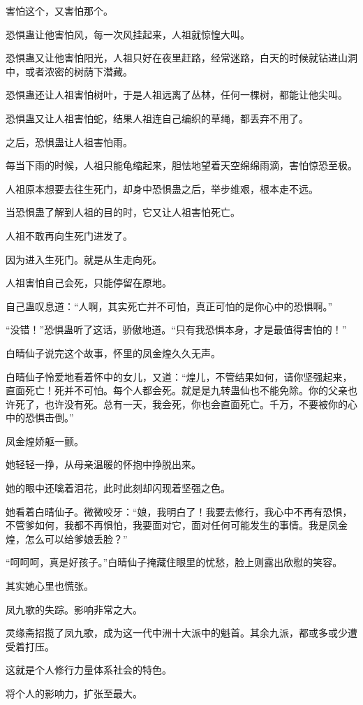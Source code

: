 \begin{this_body}
害怕这个，又害怕那个。

恐惧蛊让他害怕风，每一次风挂起来，人祖就惊惶大叫。

恐惧蛊又让他害怕阳光，人祖只好在夜里赶路，经常迷路，白天的时候就钻进山洞中，或者浓密的树荫下潜藏。

恐惧蛊还让人祖害怕树叶，于是人祖远离了丛林，任何一棵树，都能让他尖叫。

恐惧蛊又让人祖害怕蛇，结果人祖连自己编织的草绳，都丢弃不用了。

之后，恐惧蛊让人祖害怕雨。

每当下雨的时候，人祖只能龟缩起来，胆怯地望着天空绵绵雨滴，害怕惊恐至极。

人祖原本想要去往生死门，却身中恐惧蛊之后，举步维艰，根本走不远。

当恐惧蛊了解到人祖的目的时，它又让人祖害怕死亡。

人祖不敢再向生死门进发了。

因为进入生死门。就是从生走向死。

人祖害怕自己会死，只能停留在原地。

自己蛊叹息道：“人啊，其实死亡并不可怕，真正可怕的是你心中的恐惧啊。”

“没错！”恐惧蛊听了这话，骄傲地道。“只有我恐惧本身，才是最值得害怕的！”

白晴仙子说完这个故事，怀里的凤金煌久久无声。

白晴仙子怜爱地看着怀中的女儿，又道：“煌儿，不管结果如何，请你坚强起来，直面死亡！死并不可怕。每个人都会死。就是是九转蛊仙也不能免除。你的父亲也许死了，也许没有死。总有一天，我会死，你也会直面死亡。千万，不要被你的心中的恐惧击倒。”

凤金煌娇躯一颤。

她轻轻一挣，从母亲温暖的怀抱中挣脱出来。

她的眼中还噙着泪花，此时此刻却闪现着坚强之色。

她看着白晴仙子。微微咬牙：“娘，我明白了！我要去修行，我心中不再有恐惧，不管爹如何，我都不再惧怕，我要面对它，面对任何可能发生的事情。我是凤金煌，怎么可以给爹娘丢脸？”

“呵呵呵，真是好孩子。”白晴仙子掩藏住眼里的忧愁，脸上则露出欣慰的笑容。

其实她心里也慌张。

凤九歌的失踪。影响非常之大。

灵缘斋招揽了凤九歌，成为这一代中洲十大派中的魁首。其余九派，都或多或少遭受着打压。

这就是个人修行力量体系社会的特色。

将个人的影响力，扩张至最大。


\end{this_body}

